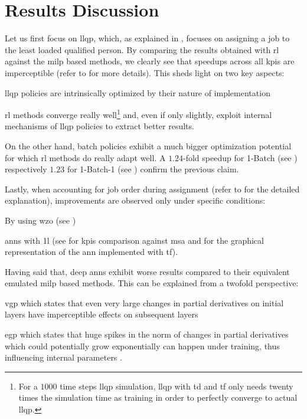 \section{ Results Discussion}
\label{sec:rl_discussion}

Let us first focus on \gls{llqp}, which, as explained in , focuses on assigning a job to the least loaded qualified person. By comparing the results obtained with \gls{rl} against the \gls{milp} based methods, we clearly see that speedups across all \glspl{kpi} are imperceptible (refer to  for more details). This sheds light on two key aspects:
\begin{enumerate*}
	\item \gls{llqp} policies are intrinsically optimized by their nature of implementation
	\item \gls{rl} methods converge really well\footnote{For a $1000$ time steps \gls{llqp} simulation, \gls{llqp} with \gls{td} and \gls{tf} only needs twenty times the simulation time as training in order to perfectly converge to actual \gls{llqp}.} and, even if only slightly, exploit internal mechanisms of \gls{llqp} policies to extract better results.
\end{enumerate*}

On the other hand, batch policies exhibit a much bigger optimization potential for which \gls{rl} methods do really adapt well. A $1.24$-fold speedup for 1-Batch (see ) respectively $1.23$ for 1-Batch-1 (see ) confirm the previous claim.

Lastly, when accounting for job order during assignment (refer to  for the detailed explanation), improvements are observed only under specific conditions:
\begin{enumerate*}
	\item By using \gls{wzo} (see ) 
	\item \glspl{ann} with \gls{1l} (see  for \glspl{kpi} comparison against \gls{msa} and  for the graphical representation of the \gls{ann} implemented with \gls{tf}).
\end{enumerate*}

Having said that, deep \glspl{ann} exhibit worse results compared to their equivalent emulated \gls{milp} based methods. This can be explained from a twofold perspective:
\begin{enumerate*}
	\item \gls{vgp} which states that even very large changes in partial derivatives on initial layers have imperceptible effects on subsequent layers \citep{Bengio1994}
	\item \gls{egp} which states that huge spikes in the norm of changes in partial derivatives which could potentially grow exponentially can happen under training, thus influencing internal parameters \citep{Bengio1994,Pascanu2012}.
\end{enumerate*}

